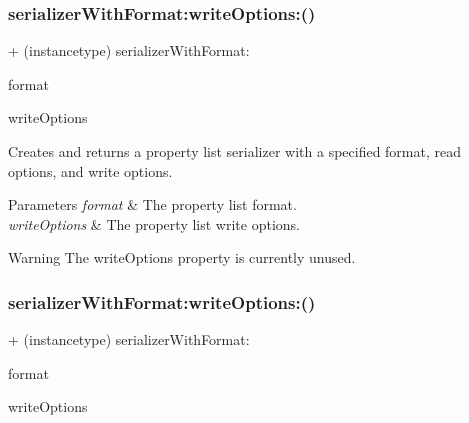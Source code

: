 \subsubsection{\texorpdfstring{serializer\+With\+Format\+:write\+Options\+:()}{serializerWithFormat:writeOptions:()}\hspace{0.1cm}{\footnotesize\ttfamily [2/3]}}
{\footnotesize\ttfamily + (instancetype) serializer\+With\+Format\+: \begin{DoxyParamCaption}\item[{(N\+S\+Property\+List\+Format)}]{format }\item[{writeOptions:(N\+S\+Property\+List\+Write\+Options)}]{write\+Options }\end{DoxyParamCaption}}

Creates and returns a property list serializer with a specified format, read options, and write options.


\begin{DoxyParams}{Parameters}
{\em format} & The property list format. \\
\hline
{\em write\+Options} & The property list write options.\\
\hline
\end{DoxyParams}
\begin{DoxyWarning}{Warning}
The {\ttfamily write\+Options} property is currently unused. 
\end{DoxyWarning}
\mbox{\label{interface_a_f_property_list_request_serializer_aa8620db96210cdd972538da3b5954c85}} 
\subsubsection{\texorpdfstring{serializer\+With\+Format\+:write\+Options\+:()}{serializerWithFormat:writeOptions:()}\hspace{0.1cm}{\footnotesize\ttfamily [3/3]}}
{\footnotesize\ttfamily + (instancetype) serializer\+With\+Format\+: \begin{DoxyParamCaption}\item[{(N\+S\+Property\+List\+Format)}]{format }\item[{writeOptions:(N\+S\+Property\+List\+Write\+Options)}]{write\+Options }\end{DoxyParamCaption}}

